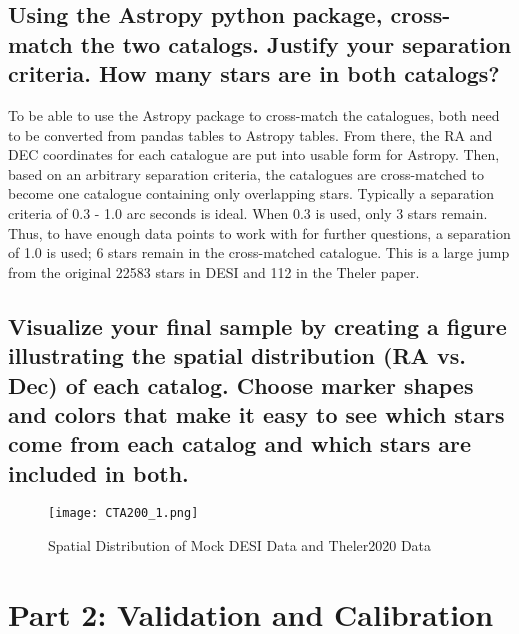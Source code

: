 \documentclass{article}
\begin{document}
\subsection{Using the Astropy python package, cross-match the two catalogs. Justify your separation criteria. How many stars are in both catalogs?}
To be able to use the Astropy package to cross-match the catalogues, both need to be converted from pandas tables to Astropy tables. From there, the RA and DEC coordinates for each catalogue are put into usable form for Astropy. Then, based on an arbitrary separation criteria, the catalogues are cross-matched to become one catalogue containing only overlapping stars. Typically a separation criteria of 0.3 - 1.0 arc seconds is ideal. When 0.3 is used, only 3 stars remain. Thus, to have enough data points to work with for further questions, a separation of 1.0 is used; 6 stars remain in the cross-matched catalogue. This is a large jump from the original 22583 stars in DESI and 112 in the Theler paper. 

\subsection{Visualize your final sample by creating a figure illustrating the spatial distribution (RA vs. Dec) of each catalog. Choose marker shapes and colors that make it easy to see which stars come from each catalog and which stars are included in both.}
\begin{figure}[h]
\centering
\texttt{[image: CTA200\_1.png]}
\caption{Spatial Distribution of Mock DESI Data and Theler2020 Data}
\end{figure}

\bigskip\noindent

\section{Part 2: Validation and Calibration}
\bigskip\noindent
\end{document}
